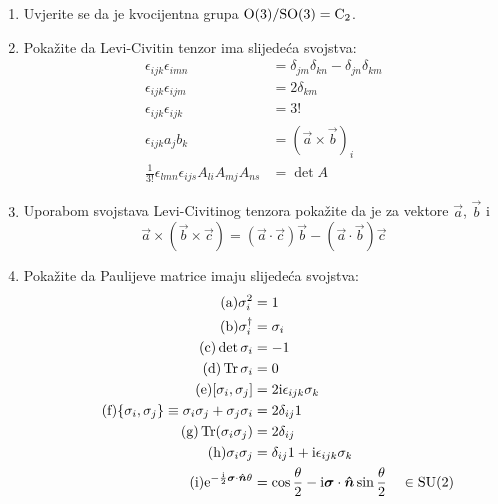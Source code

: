 \begin{enumerate}[label=\arabic{chapter}.\arabic*.]

\item \label{zad:O3oSO3} Uvjerite se da je kvocijentna grupa $\mathrm{O}(3)/\mathrm{SO}(3) = \mathrm{C}_{2}$.

\item \label{zad:svojstvalevicivite} Pokažite da Levi-Civitin tenzor ima slijedeća svojstva:
\begin{align*}
\tag{a}\epsilon_{ijk}\epsilon_{imn}&=\delta_{jm}\delta_{kn}-\delta_{jn}\delta_{km}\\
\tag{b}\epsilon_{ijk}\epsilon_{ijm}&=2\delta_{km} \\
\tag{c}\epsilon_{ijk}\epsilon_{ijk}&=3! \\
\tag{d}\epsilon_{ijk}a_j b_k &= (\vec{a}\times\vec{b})_i  \\
\tag{e}\frac{1}{3!}\epsilon_{lmn} \epsilon_{ijs} A_{li} A_{mj} A_{ns} &= \det A
\end{align*}

\item Uporabom svojstava Levi-Civitinog tenzora pokažite da je
za vektore $\vec{a}$, $\vec{b}$ i 
\begin{displaymath}
    \vec{a}\times(\vec{b}\times\vec{c})=(\vec{a}\cdot\vec{c})\vec{b}
 -(\vec{a}\cdot\vec{b})\vec{c}
\end{displaymath}

\item \label{zad:svojstvapaulijevih} Pokažite da Paulijeve matrice imaju slijedeća svojstva:
     
\begin{align*}
\tag{a} \sigma_{i}^2 &= 1 \\
\tag{b} \sigma_{i}^\dagger &= \sigma_i \\
\tag{c} \det \sigma_i &= -1 \\
\tag{d} \Tr \sigma_i &=0 \\
\tag{e} [\sigma_i, \sigma_j] &= 2 \rmi \epsilon_{ijk} \sigma_k \\
\tag{f} \{\sigma_i, \sigma_j\}\equiv \sigma_i\sigma_j + \sigma_j \sigma_i &= 2
\delta_{ij} 1 \\
\tag{g} \Tr (\sigma_i \sigma_j) &= 2\delta_{ij} \\
\tag{h} \sigma_i \sigma_j &= \delta_{ij} 1 + \rmi \epsilon_{ijk}\sigma_k\\
\tag{i} \rme^{-\frac{\rmi}{2}\vec{\sigma}\cdot\unitn \theta} &=
\cos \frac{\theta}{2}-\rmi\vec{\sigma}\cdot\unitn \sin\frac{\theta}{2} \quad\in \SU{2}
\end{align*}


\end{enumerate}
